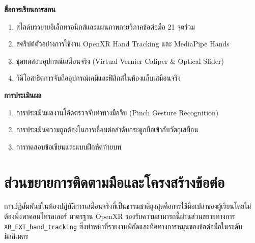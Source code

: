 \noindent\textbf{สื่อการเรียนการสอน}
\begin{enumerate}
    \item สไลด์บรรยายอิเล็กทรอนิกส์และแผนภาพกายวิภาคข้อต่อมือ 21 จุดร่วม
    \item สคริปต์ตัวอย่างการใช้งาน OpenXR Hand Tracking และ MediaPipe Hands
    \item ชุดทดสอบอุปกรณ์เสมือนจริง (Virtual Vernier Caliper \& Optical Slider)
    \item วิดีโอสาธิตการจับถืออุปกรณ์เคมีและฟิสิกส์ในห้องแล็บเสมือนจริง
\end{enumerate}

\noindent\textbf{การประเมินผล}
\begin{enumerate}
    \item การประเมินผลงานโค้ดตรวจจับท่าทางมือจีบ (Pinch Gesture Recognition)
    \item การประเมินความถูกต้องในการเชื่อมต่อลำดับกระดูกมือเข้ากับวัตถุเสมือน
    \item การทดสอบข้อเขียนและแบบฝึกหัดท้ายบท
\end{enumerate}

\newpage

\section{ส่วนขยายการติดตามมือและโครงสร้างข้อต่อ}

การปฏิสัมพันธ์ในห้องปฏิบัติการเสมือนจริงที่เป็นธรรมชาติสูงสุดคือการใช้มือเปล่าของผู้เรียนโดยไม่ต้องพึ่งพาคอนโทรลเลอร์ มาตรฐาน OpenXR รองรับความสามารถนี้ผ่านส่วนขยายทางการ \texttt{XR\_EXT\_hand\_tracking} ซึ่งทำหน้าที่รายงานพิกัดและทิศทางการหมุนของข้อต่อมือในระดับมิลลิเมตร

